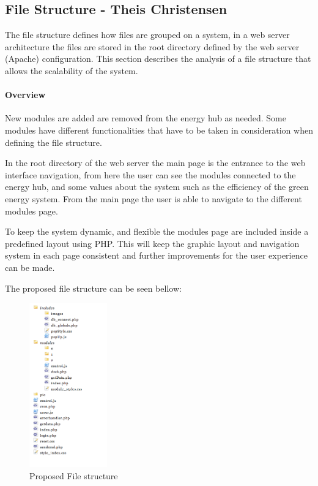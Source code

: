 \subsection{File Structure - Theis Christensen }
The file structure defines how files are grouped on a system, in a web server architecture the files are stored in the root directory defined by the web server (Apache) configuration. This section describes the analysis of a file structure that allows the scalability of the system.

\paragraph{Overview}
New modules are added are removed from the energy hub as needed. Some modules have different functionalities that have to be taken in consideration when defining the file structure.

In the root directory of the web server the main page is the entrance to the web interface navigation, from here the user can see the modules connected to the energy hub, and some values about the system such as the efficiency of the green energy system. From the main page the user is able to navigate to the different modules page.

To keep the system dynamic, and flexible the modules page are included inside a predefined layout using PHP. This will keep the graphic layout and navigation system in each page consistent and further improvements for the user experience can be made.

The proposed file structure can be seen bellow:
\begin{figure}[H]
	\begin{centering}
		\includegraphics[width=0.3\textwidth]{images/file_structure.png}
		\caption{Proposed File structure}
	\end{centering}
\end{figure}

